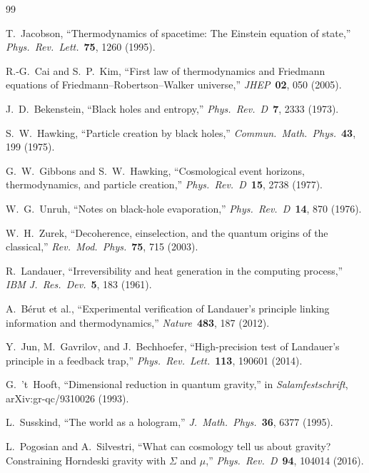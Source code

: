\documentclass[twocolumn,a4paper,aps,prd,twocolumn,showpacs,notitlepage,superscriptaddress,nofootinbib]{article}
\begin{document}
\begin{thebibliography}{99}

T.~Jacobson,
``Thermodynamics of spacetime: The Einstein equation of state,''
\textit{Phys.\ Rev.\ Lett.}\ \textbf{75}, 1260 (1995).

R.-G.~Cai and S.~P.~Kim,
``First law of thermodynamics and Friedmann equations of
Friedmann--Robertson--Walker universe,''
\textit{JHEP}\ \textbf{02}, 050 (2005).

J.~D.~Bekenstein,
``Black holes and entropy,''
\textit{Phys.\ Rev.\ D}\ \textbf{7}, 2333 (1973).

S.~W.~Hawking,
``Particle creation by black holes,''
\textit{Commun.\ Math.\ Phys.}\ \textbf{43}, 199 (1975).

G.~W.~Gibbons and S.~W.~Hawking,
``Cosmological event horizons, thermodynamics, and particle creation,''
\textit{Phys.\ Rev.\ D}\ \textbf{15}, 2738 (1977).

W.~G.~Unruh,
``Notes on black-hole evaporation,''
\textit{Phys.\ Rev.\ D}\ \textbf{14}, 870 (1976).

W.~H.~Zurek,
``Decoherence, einselection, and the quantum origins of the classical,''
\textit{Rev.\ Mod.\ Phys.}\ \textbf{75}, 715 (2003).

R.~Landauer,
``Irreversibility and heat generation in the computing process,''
\textit{IBM J.\ Res.\ Dev.}\ \textbf{5}, 183 (1961).

A.~B\'{e}rut et al.,
``Experimental verification of Landauer's principle linking information and
thermodynamics,''
\textit{Nature}\ \textbf{483}, 187 (2012).

Y.~Jun, M.~Gavrilov, and J.~Bechhoefer,
``High-precision test of Landauer's principle in a feedback trap,''
\textit{Phys.\ Rev.\ Lett.}\ \textbf{113}, 190601 (2014).

G.~'t~Hooft,
``Dimensional reduction in quantum gravity,''
in \textit{Salamfestschrift}, arXiv:gr-qc/9310026 (1993).

L.~Susskind,
``The world as a hologram,''
\textit{J.\ Math.\ Phys.}\ \textbf{36}, 6377 (1995).

L.~Pogosian and A.~Silvestri,
``What can cosmology tell us about gravity? Constraining Horndeski gravity
with $\Sigma$ and $\mu$,''
\textit{Phys.\ Rev.\ D}\ \textbf{94}, 104014 (2016).


\end{thebibliography}
\end{document}
